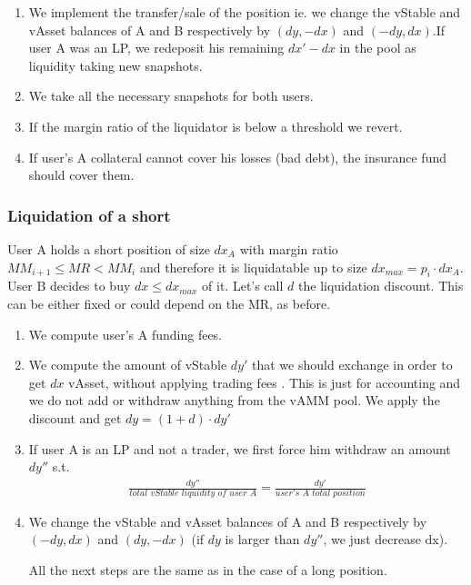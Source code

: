 \documentclass{article}
\begin{document}
\begin{enumerate}
\item  We implement the transfer/sale of the position ie. we change the vStable and vAsset balances of A and B respectively by $(dy,-dx)$ and $(-dy,dx)$.If user A was an LP, we redeposit his remaining $dx'-dx$ in the pool as liquidity taking new snapshots.

\item  We take all the necessary snapshots for both users.

\item If the margin ratio of the liquidator is below a threshold we revert.

\item If user's A collateral cannot cover his losses (bad debt), the insurance fund should cover them. 
\end{enumerate}

\subsubsection{Liquidation of a short}

User A holds a short position of size $dx_A$ with margin ratio $MM_{i+1}\leq MR < MM_i$ and therefore it is liquidatable up to size $dx_{max}=p_i \cdot dx_A$. User B decides to buy $dx\leq dx_{max}$ of it. Let's call $d$ the liquidation discount. This can be either fixed or could depend on the MR, as before.
\begin{enumerate}
\item  We compute user's A funding fees.

\item  We compute the amount of vStable $dy'$ that we should exchange in order to get $dx$ vAsset, without applying trading fees . This is just for accounting and we do not add or withdraw anything from the vAMM pool.  We apply the discount and get $dy=(1+d)\cdot dy'$

\item  If user A is an LP and not a trader, we first force him withdraw an amount $dy''$ s.t. 
\begin{align*}
\frac{dy''}{\textit{total vStable liquidity of user A}}=\frac{dy'}{\textit{user's A total position}}
\end{align*}
\item  We change the vStable and vAsset balances of A and B respectively by $(-dy,dx)$ and $(dy,-dx)$ (if $dy$ is larger than $dy''$, we just decrease dx).

All the next steps are the same as in the case of a long position.
\end{enumerate}
\end{document}
